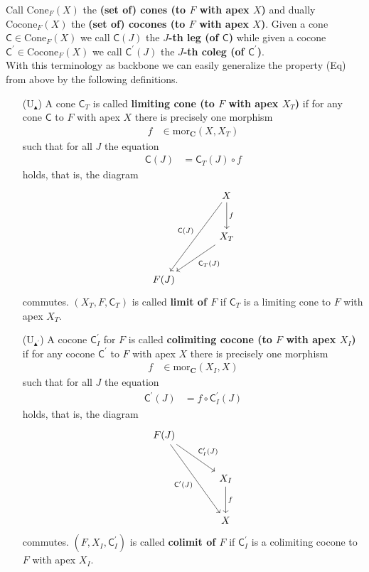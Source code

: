 Call $\mathrm{Cone}_{F}(X)$ the \textbf{(set of) cones (to $F$ with apex $X$)} and dually $\mathrm{Cocone}_{F}(X)$ the \textbf{(set of) cocones (to $F$ with apex $X$)}. Given a cone $\mathsf{C} \in \mathrm{Cone}_{F}(X)$ we call $\mathsf{C}(J)$ the \textbf{$J$-th leg (of $\mathsf{C}$)} while given a cocone $\mathsf{C}^{\prime} \in \mathrm{Cocone}_{F}(X)$ we call $\mathsf{C}^{\prime}(J)$ the \textbf{$J$-th coleg (of $\mathsf{C}^{\prime}$)}.
\\
With this terminology as backbone we can easily generalize the property (Eq) from above by the following definitions.
\begin{enumerate}
\item[(U${}_{\blacktriangle}$)]
A cone $\mathsf{C}_{T}$ is called \textbf{limiting cone (to $F$ with apex $X_{T}$)} if for any cone $\mathsf{C}$ to $F$ with apex $X$ there is precisely one morphism
\begin{align*}
  f
  &\in
  \mathrm{mor}_{\mathbf{C}}(X,X_{T})
\end{align*}
such that for all $J$ the equation
\begin{align*}
  \mathsf{C}(J)
  &=
  \mathsf{C}_{T}(J)
  \circ
  f
\end{align*}
holds, that is, the diagram
\[
\begin{tikzcd}[sep=large]
  &
  X
  \arrow{d}{f}
  \arrow[swap]{ddl}{\mathsf{C}(J)}
  \\
  &
  X_{T}
  \arrow{dl}{\mathsf{C}_{T}(J)}
  \\
  F(J)
\end{tikzcd}
\]
commutes. $(X_{T},F,\mathsf{C}_{T})$ is called \textbf{limit of $F$} if $\mathsf{C}_{T}$ is a limiting cone to $F$ with apex $X_{T}$.
\item[(U${}_{\blacktriangle^{\prime}}$)]
A cocone $\mathsf{C}_{I}^{\prime}$ for $F$ is called \textbf{colimiting cocone (to $F$ with apex $X_{I}$)} if for any cocone $\mathsf{C}^{\prime}$ to $F$ with apex $X$ there is precisely one morphism
\begin{align*}
  f
  &\in
  \mathrm{mor}_{\mathbf{C}}(X_{I},X)
\end{align*}
such that for all $J$ the equation
\begin{align*}
  \mathsf{C}^{\prime}(J)
  &=
  f
  \circ
  \mathsf{C}_{I}^{\prime}(J)
\end{align*}
holds, that is, the diagram
\[
\begin{tikzcd}[sep=large]
  F(J)
  \arrow{dr}{\mathsf{C}_{I}^{\prime}(J)}
  \arrow[swap]{ddr}{\mathsf{C}^{\prime}(J)}
  &
  \\
  &
  X_{I}
  \arrow{d}{f}
  \\
  &
  X
\end{tikzcd}
\]
commutes. $(F,X_{I},\mathsf{C}_{I}^{\prime})$ is called \textbf{colimit of $F$} if $\mathsf{C}_{I}^{\prime}$ is a colimiting cocone to $F$ with apex $X_{I}$.
\end{enumerate}
